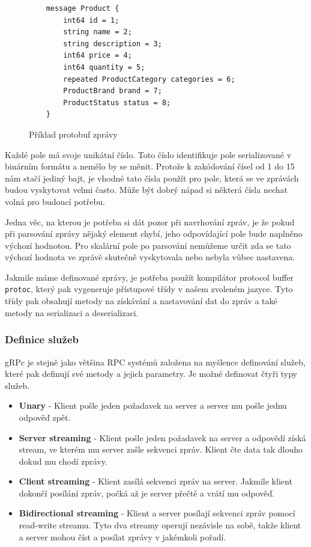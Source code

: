 \documentclass[thesis=M,czech]{FITthesis}[2019/12/23]
\begin{document}
\begin{figure}[H]
\begin{verbatim}
    message Product {
        int64 id = 1;
        string name = 2;
        string description = 3;
        int64 price = 4;
        int64 quantity = 5;
        repeated ProductCategory categories = 6;
        ProductBrand brand = 7;
        ProductStatus status = 8;
    }
\end{verbatim}
\caption{Příklad protobuf zprávy}
\label{proto-message}   
\end{figure}

Každé pole má svoje unikátní číslo. Toto číslo identifikuje pole serializované v binárním formátu a nemělo by se měnit. Protože k zakódování čísel od 1 do 15 nám stačí jediný bajt, je vhodné tato čísla použít pro pole, která se ve zprávách budou vyskytovat velmi často. Může být dobrý nápad si některá čísla nechat volná pro budoucí potřebu.

Jedna věc, na kterou je potřeba si dát pozor při navrhování zpráv, je že pokud při parsování zprávy nějaký element chybí, jeho odpovídající pole bude naplněno výchozí hodnotou. Pro skalární pole po parsování nemůžeme určit zda se tato výchozí hodnota ve zprávě skutečně vyskytovala nebo nebyla vůbec nastavena. 

Jakmile máme definované zprávy, je potřeba použít kompilátor protocol buffer \texttt{protoc}, který pak vygeneruje přístupové třídy v našem zvoleném jazyce. Tyto třídy pak obsahují metody na získávání a nastavování dat do zpráv a také metody na serializaci a deserializaci.

\subsubsection*{Definice služeb}
gRPc je stejně jako většina RPC systémů založena na myšlence definování služeb, které pak definují své metody a jejich parametry. Je možné definovat čtyři typy služeb.

\begin{itemize}
    \item \textbf{Unary} - Klient pošle jeden požadavek na server a server mu pošle jednu odpověď zpět.
    \item \textbf{Server streaming} - Klient pošle jeden požadavek na server a odpovědí získá stream, ve kterém mu server zašle sekvenci zpráv. Klient čte data tak dlouho dokud mu chodí zprávy.
    \item \textbf{Client streaming} - Klient zasílá sekvenci zpráv na server. Jakmile klient dokončí posílání zpráv, počká až je server přečtě a vrátí mu odpověď.
    \item \textbf{Bidirectional streaming} - Klient a server posílají sekvenci zpráv pomocí read-write streamu. Tyto dva streamy operují nezávisle na sobě, takže klient a server mohou číst a posílat zprávy v jakémkoli pořadí.
\end{itemize}
\end{document}
